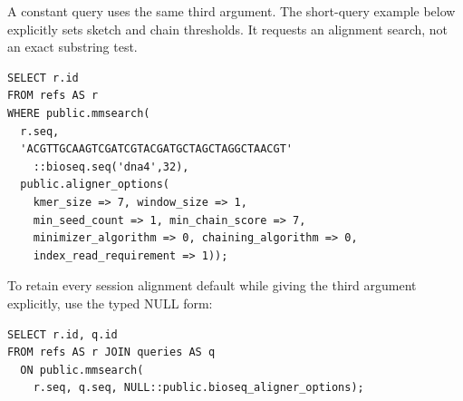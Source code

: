 A constant query uses the same third argument. The short-query example
below explicitly sets sketch and chain thresholds. It requests an alignment
search, not an exact substring test.

\par\noindent\begin{minipage}{\linewidth}
\begin{lstlisting}[style=bioseq-appendix-sql,
  caption={Search stored sequences with a typed constant query.},
  label={lst:appendix-options-constant-query}]
SELECT r.id
FROM refs AS r
WHERE public.mmsearch(
  r.seq,
  'ACGTTGCAAGTCGATCGTACGATGCTAGCTAGGCTAACGT'
    ::bioseq.seq('dna4',32),
  public.aligner_options(
    kmer_size => 7, window_size => 1,
    min_seed_count => 1, min_chain_score => 7,
    minimizer_algorithm => 0, chaining_algorithm => 0,
    index_read_requirement => 1));
\end{lstlisting}
\end{minipage}

To retain every session alignment default while giving the third argument
explicitly, use the typed NULL form:

\par\noindent\begin{minipage}{\linewidth}
\begin{lstlisting}[style=bioseq-appendix-sql,
  caption={Use the three-argument overload without overrides.},
  label={lst:appendix-options-null}]
SELECT r.id, q.id
FROM refs AS r JOIN queries AS q
  ON public.mmsearch(
    r.seq, q.seq, NULL::public.bioseq_aligner_options);
\end{lstlisting}
\end{minipage}

